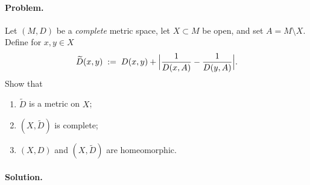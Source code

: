 \documentclass[12pt]{article}
\theoremstyle{definition} %
\theoremstyle{plain} %
\begin{document}
\paragraph{Problem.}
Let \((M,D)\) be a \emph{complete} metric space, let \(X\subset M\) be
open, and set \(A=M\setminus X\).
Define for \(x,y\in X\)
\[
   \widetilde D(x,y)\;:=\;
   D(x,y)+\Bigl|\frac1{D(x,A)}-\frac1{D(y,A)}\Bigr|.
\]
Show that
\begin{enumerate}[label=(\alph*)]
   \item \(\widetilde D\) is a metric on \(X\);
   \item \((X,\widetilde D)\) is complete;
   \item \((X,D)\) and \((X,\widetilde D)\) are homeomorphic.
\end{enumerate}

\bigskip
\paragraph{Solution.}
\end{document}
